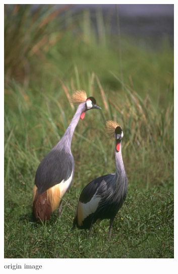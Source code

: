 \documentclass[a4paper]{ctexart}
\begin{document}
	\begin{figure}[htb] 
		\centering 		
		\begin{subfigure}{0.2\textwidth}
			\includegraphics[width=\linewidth]{picture/LLIE/RCF/origin image}
			\captionsetup{font=scriptsize}
			\caption{origin image}
			\label{fig: origin image}
		\end{subfigure}
		\begin{subfigure}{0.2\textwidth}

\end{subfigure}
\end{figure}
\end{document}
